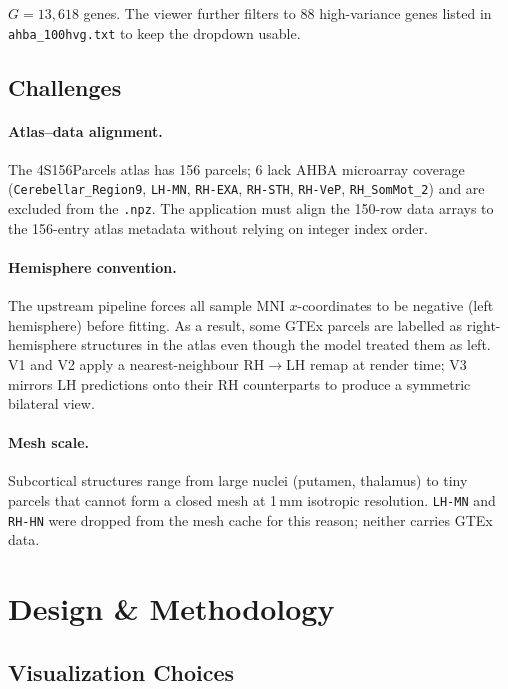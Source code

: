 \documentclass[11pt,letterpaper]{article}
\begin{document}
\noindent $G = 13{,}618$ genes.
The viewer further filters to 88 high-variance genes listed in
\texttt{ahba\_100hvg.txt} to keep the dropdown usable.

\subsection{Challenges}

\paragraph{Atlas--data alignment.}
The 4S156Parcels atlas has 156 parcels; 6 lack AHBA microarray coverage
(\texttt{Cerebellar\_Region9}, \texttt{LH-MN}, \texttt{RH-EXA},
\texttt{RH-STH}, \texttt{RH-VeP}, \texttt{RH\_SomMot\_2}) and are
excluded from the \texttt{.npz}.
The application must align the 150-row data arrays to the 156-entry
atlas metadata without relying on integer index order.

\paragraph{Hemisphere convention.}
The upstream pipeline forces all sample MNI $x$-coordinates to be negative
(left hemisphere) before fitting.
As a result, some GTEx parcels are labelled as right-hemisphere structures
in the atlas even though the model treated them as left.
V1 and V2 apply a nearest-neighbour RH$\to$LH remap at render time;
V3 mirrors LH predictions onto their RH counterparts to produce a symmetric
bilateral view.

\paragraph{Mesh scale.}
Subcortical structures range from large nuclei (putamen, thalamus) to tiny
parcels that cannot form a closed mesh at 1\,mm isotropic resolution.
\texttt{LH-MN} and \texttt{RH-HN} were dropped from the mesh cache for this
reason; neither carries GTEx data.

\section{Design \& Methodology}
\label{sec:design}

\subsection{Visualization Choices}
\end{document}
